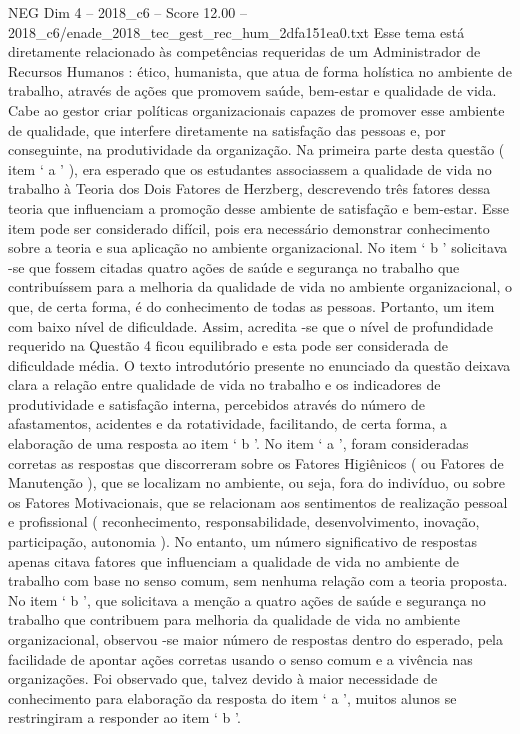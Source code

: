 \begin{textsample}{NEG Dim 4 – 2018\_c6 – Score 12.00 – 2018\_c6/enade\_2018\_tec\_gest\_rec\_hum\_2dfa151ea0.txt}
Esse tema está diretamente relacionado às competências requeridas de um Administrador de Recursos Humanos : ético, humanista, que atua de forma holística no ambiente de trabalho, através de ações que promovem saúde, bem-estar e qualidade de vida.
Cabe ao gestor criar políticas organizacionais capazes de promover esse ambiente de qualidade, que interfere diretamente na satisfação das pessoas e, por conseguinte, na produtividade da organização.
Na primeira parte desta questão ( item ‘ a ’ ), era esperado que os estudantes associassem a qualidade de vida no trabalho à Teoria dos Dois Fatores de Herzberg, descrevendo três fatores dessa teoria que influenciam a promoção desse ambiente de satisfação e bem-estar.
Esse item pode ser considerado difícil, pois era necessário demonstrar conhecimento sobre a teoria e sua aplicação no ambiente organizacional.
No item ‘ b ’ solicitava -se que fossem citadas quatro ações de saúde e segurança no trabalho que contribuíssem para a melhoria da qualidade de vida no ambiente organizacional, o que, de certa forma, é do conhecimento de todas as pessoas.
Portanto, um item com baixo nível de dificuldade.
Assim, acredita -se que o nível de profundidade requerido na Questão 4 ficou equilibrado e esta pode ser considerada de dificuldade média.
O texto introdutório presente no enunciado da questão deixava clara a relação entre qualidade de vida no trabalho e os indicadores de produtividade e satisfação interna, percebidos através do número de afastamentos, acidentes e da rotatividade, facilitando, de certa forma, a elaboração de uma resposta ao item ‘ b ’.
No item ‘ a ’, foram consideradas corretas as respostas que discorreram sobre os Fatores Higiênicos ( ou Fatores de Manutenção ), que se localizam no ambiente, ou seja, fora do indivíduo, ou sobre os Fatores Motivacionais, que se relacionam aos sentimentos de realização pessoal e profissional ( reconhecimento, responsabilidade, desenvolvimento, inovação, participação, autonomia ).
No entanto, um número significativo de respostas apenas citava fatores que influenciam a qualidade de vida no ambiente de trabalho com base no senso comum, sem nenhuma relação com a teoria proposta.
No item ‘ b ’, que solicitava a menção a quatro ações de saúde e segurança no trabalho que contribuem para melhoria da qualidade de vida no ambiente organizacional, observou -se maior número de respostas dentro do esperado, pela facilidade de apontar ações corretas usando o senso comum e a vivência nas organizações.
Foi observado que, talvez devido à maior necessidade de conhecimento para elaboração da resposta do item ‘ a ’, muitos alunos se restringiram a responder ao item ‘ b ’.

\end{textsample}
